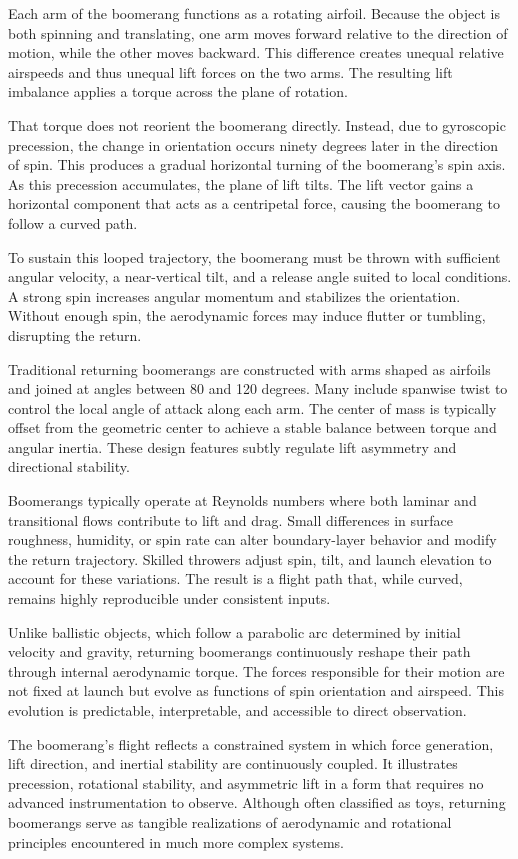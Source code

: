 Each arm of the boomerang functions as a rotating airfoil. Because the object is both spinning and translating, one arm moves forward relative to the direction of motion, while the other moves backward. This difference creates unequal relative airspeeds and thus unequal lift forces on the two arms. The resulting lift imbalance applies a torque across the plane of rotation.

That torque does not reorient the boomerang directly. Instead, due to gyroscopic precession, the change in orientation occurs ninety degrees later in the direction of spin. This produces a gradual horizontal turning of the boomerang’s spin axis. As this precession accumulates, the plane of lift tilts. The lift vector gains a horizontal component that acts as a centripetal force, causing the boomerang to follow a curved path.

To sustain this looped trajectory, the boomerang must be thrown with sufficient angular velocity, a near-vertical tilt, and a release angle suited to local conditions. A strong spin increases angular momentum and stabilizes the orientation. Without enough spin, the aerodynamic forces may induce flutter or tumbling, disrupting the return.

Traditional returning boomerangs are constructed with arms shaped as airfoils and joined at angles between 80 and 120 degrees. Many include spanwise twist to control the local angle of attack along each arm. The center of mass is typically offset from the geometric center to achieve a stable balance between torque and angular inertia. These design features subtly regulate lift asymmetry and directional stability.

Boomerangs typically operate at Reynolds numbers where both laminar and transitional flows contribute to lift and drag. Small differences in surface roughness, humidity, or spin rate can alter boundary-layer behavior and modify the return trajectory. Skilled throwers adjust spin, tilt, and launch elevation to account for these variations. The result is a flight path that, while curved, remains highly reproducible under consistent inputs.

Unlike ballistic objects, which follow a parabolic arc determined by initial velocity and gravity, returning boomerangs continuously reshape their path through internal aerodynamic torque. The forces responsible for their motion are not fixed at launch but evolve as functions of spin orientation and airspeed. This evolution is predictable, interpretable, and accessible to direct observation.

The boomerang's flight reflects a constrained system in which force generation, lift direction, and inertial stability are continuously coupled. It illustrates precession, rotational stability, and asymmetric lift in a form that requires no advanced instrumentation to observe. Although often classified as toys, returning boomerangs serve as tangible realizations of aerodynamic and rotational principles encountered in much more complex systems.
